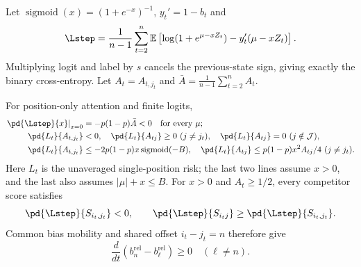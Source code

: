 Let $\operatorname{sigmoid}(x)=(1+e^{-x})^{-1}$, $y_t'=1-b_t$ and
\begin{equation}\label{eq:lr-logistic-risk}
 \Lstep=\frac1{n-1}\sum_{t=2}^n\mathbb E
 \left[\log(1+e^{\mu-xZ_t})-y_t'(\mu-xZ_t)\right].
\end{equation}
Multiplying logit and label by $s$ cancels the previous-state sign, giving exactly the binary cross-entropy.
Let $A_t=A_{t,j_t}$ and $\bar A=\frac1{n-1}\sum_{t=2}^n A_t$.

\begin{lemma}
\label{lem:lr-signs}\label{lem:lr-postrouting-gradient}
For position-only attention and finite logits,
\begin{align}
 \left.\pd{\Lstep}{x}\right|_{x=0}&=-p(1-p)\bar A<0
 \quad\text{for every }\mu;\label{eq:lr-initial-gate-gradient}\\
 \pd{L_t}{A_{t,j_t}}&<0,\quad \pd{L_t}{A_{tj}}\ge0\ (j\ne j_t),
 \quad \pd{L_t}{A_{tj}}=0\ (j\notin\mathcal J),\label{eq:lr-feature-source-signs}\\
 \pd{L_t}{A_{t,j_t}}&\le-2p(1-p)x\operatorname{sigmoid}(-B),\quad
 \pd{L_t}{A_{tj}}\le p(1-p)x^2A_{tj}/4\ (j\ne j_t).
 \label{eq:lr-source-bounds}
\end{align}
Here $L_t$ is the unaveraged single-position risk; the last two lines
assume $x>0$, and the last also assumes $|\mu|+x\le B$.
For $x>0$ and $A_t\ge1/2$, every competitor score satisfies
\begin{equation}\label{eq:lr-score-comparison}
 \pd{\Lstep}{S_{i_t,j_t}}<0,\qquad
 \pd{\Lstep}{S_{i_tj}}\ge\pd{\Lstep}{S_{i_t,j_t}}.
\end{equation}
Common bias mobility and shared offset $i_t-j_t=n$ therefore give
\begin{equation}\label{eq:lr-bias-gap-mono}
 \frac{d}{dt}(b_n^{\mathrm{rel}}-b_\ell^{\mathrm{rel}})\ge0\quad(\ell\ne n).
\end{equation}
\end{lemma}
